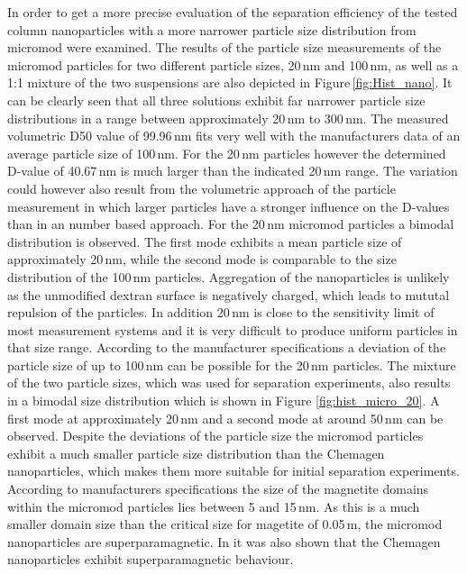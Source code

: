 In order to get a more precise evaluation of the separation efficiency of the tested column nanoparticles with a more narrower particle size distribution from micromod were examined. The results of the particle size measurements of the micromod particles for two different particle sizes, 20\,nm and 100\,nm, as well as a 1:1 mixture of the two suspensions are also depicted in Figure\,\ref{fig:Hist_nano}. It can be clearly seen that all three solutions exhibit far narrower particle size distributions in a range between approximately 20\,nm to 300\,nm. The measured volumetric D50 value of 99.96\,nm fits very well with the manufacturers data of an average particle size of 100\,nm. For the 20\,nm particles however the determined D-value of 40.67\,nm is much larger than the indicated 20\,nm range. The variation could however also result from the volumetric approach of the particle measurement in which larger particles have a stronger influence on the D-values than in an number based approach. For the 20\,nm micromod particles a bimodal distribution is observed. The first mode exhibits a mean particle size of approximately 20\,nm, while the second mode is comparable to the size distribution of the 100\,nm particles. Aggregation of the nanoparticles is unlikely as the unmodified dextran surface is negatively charged, which leads to mututal repulsion of the particles. In addition 20\,nm is close to the sensitivity limit of most measurement systems and it is very difficult to produce uniform particles in that size range. According to the manufacturer specifications a deviation of the particle size of up to 100\,nm can be possible for the 20\,nm particles. The mixture of the two particle sizes, which was used for separation experiments, also results in a bimodal size distribution which is shown in Figure \ref{fig:hist_micro_20}. A first mode at approximately 20\,nm and a second mode at around 50\,nm can be observed. Despite the deviations of the particle  size the micromod particles exhibit a much smaller particle size distribution than the Chemagen nanoparticles, which makes them more suitable for initial separation experiments. According to manufacturers specifications the size of the magnetite domains within the micromod particles lies between 5 and 15\,nm. As this is a much smaller domain size than the critical size for magetite of 0.05\,\textmu m, the micromod nanoparticles are superparamagnetic. In \cite{AndreMaster} it was also shown that the Chemagen nanoparticles exhibit superparamagnetic behaviour. 


